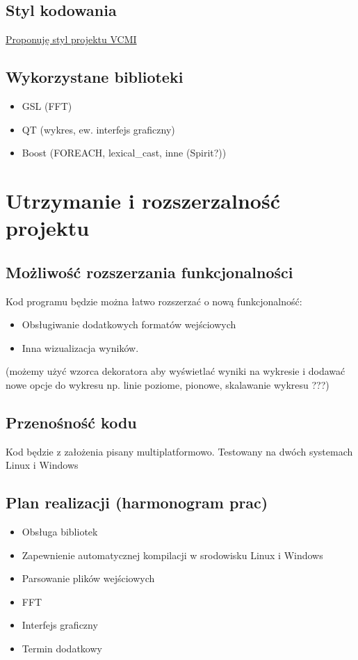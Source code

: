 \documentclass[a4size,final]{article}
\begin{document}
\subsection{Styl kodowania}
\href{http://wiki.vcmi.eu/index.php?title=Coding_guidelines}{Proponuję styl projektu VCMI}
\subsection{Wykorzystane biblioteki}
\begin{itemize}
\item GSL (FFT)
\item QT (wykres, ew. interfejs graficzny)
\item Boost (FOREACH, lexical\_cast, inne (Spirit?))
\end{itemize}
\section{Utrzymanie i rozszerzalność projektu}
\subsection{Możliwość rozszerzania funkcjonalności}
Kod programu będzie można łatwo rozszerzać o nową funkcjonalność:
\begin{itemize}
\item Obsługiwanie dodatkowych formatów wejściowych
\item Inna wizualizacja wyników.
\end{itemize}
(możemy użyć wzorca dekoratora aby wyświetlać wyniki na wykresie i dodawać nowe opcje do wykresu np. linie poziome, pionowe, skalawanie wykresu ???)
\subsection{Przenośność kodu}
Kod będzie z założenia pisany multiplatformowo. Testowany na dwóch systemach Linux i Windows
\subsection{Plan realizacji (harmonogram prac)}
\begin{itemize}
\item Obsługa bibliotek
\item Zapewnienie automatycznej kompilacji w srodowisku Linux i Windows
\item Parsowanie plików wejściowych
\item FFT
\item Interfejs graficzny
\item Termin dodatkowy
\end{itemize}
\end{document}
